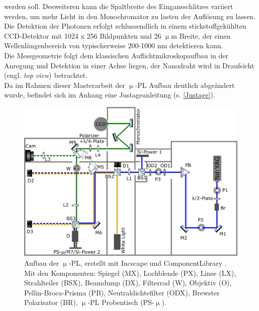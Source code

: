werden soll. Desweiteren kann die Spaltbreite des Eingansschlitzes variiert werden, um mehr Licht in den Monochromator zu lasten der Auflösung zu lassen. Die Detektion der Photonen erfolgt schlussendlich in einem stickstoffgekühlten CCD-Detektor mit 1024 x 256 Bildpunkten und 26 $\upmu$m Breite, der einen Wellenlängenbereich von typischerweise 200-1000 nm detektieren kann.\\
Die Messgeometrie folgt dem klassischen Auflichtmikroskopaufbau in der Anregung und Detektion in einer Achse liegen, der Nanodraht wird in Draufsicht (engl. \textit{top view}) betrachtet. \\
Da im Rahmen dieser Masterarbeit der $\upmu$-PL Aufbau deutlich abgeändert wurde, befindet sich im Anhang eine Justageanleitung (s. \autoref{Justage}).
\begin{figure}[h]
\centering
\includegraphics[width=1\textwidth]{Bilder/methodik/opt_aufb}
\caption[Aufbau $\upmu$-PL]{Aufbau der $\upmu$-PL, erstellt mit Incscape und ComponentLibrary \cite{lib}. Mit den Komponenten: Spiegel (MX), Lochblende (PX), Linse (LX), Strahlteiler (BSX), Beamdump (DX), Filterrad (W), Objektiv (O), Pellin-Broca-Prisma (PB), Neutraldichtefilter (ODX), Brewster Polarisator (BR), $\upmu$-PL Probentisch (PS-$\upmu$).}
\label{AufbauPL}
\end{figure}
